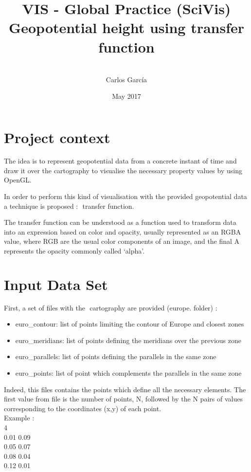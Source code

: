 \documentclass{article}
\title{VIS - Global Practice (SciVis) \\ \bigskip Geopotential height using transfer function}
\author{\\ Carlos García}
\date{May 2017}
\begin{document}
\maketitle \newpage \tableofcontents \newpage
\section{Project context}
The idea is to represent geopotential data from a concrete instant of time and draw it over the
cartography to visualise the necessary property values by using OpenGL.

In order to perform this kind of visualisation with the provided geopotential data a technique is
proposed : ​ transfer function.

The transfer function can be understood as a function used to transform data into an expression based on color and opacity, usually represented as an RGBA value, where RGB are the usual color components of an image, and the final A represents the opacity commonly called `alpha'.

\section{Input Data Set}
First, a set of files with the ​ cartography​ are provided (europe. folder) :
\begin{itemize}
  \item euro\_contour: list of points limiting the contour of Europe and closest zones
  \item euro\_meridians: list of points defining the meridians over the previous zone
  \item euro\_parallels​: list of points defining the parallels in the same zone
  \item euro\_points​: list of point which complements the parallels in the same zone
\end{itemize}

Indeed, this files contains the points which define all the necessary elements. The first value from file is the number of points, N, followed by the N pairs of values corresponding to the coordinates (x,y) of each point.\\

\noindent Example :\\
4\\
0.01  0.09\\
0.05  0.07\\
0.08  0.04\\
0.12  0.01\\
\end{document}
